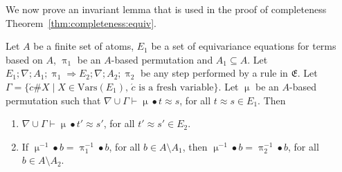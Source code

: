 \documentclass{llncs}
\newcommand{\Lra}{\Longrightarrow}
\newcommand{\vars}{\mathrm{Vars}}
\newcommand{\perm}{\approx}
\newcommand{\permef}{\bullet}
\newcommand\ppi{\uppi}
\newcommand\pmu{\upmu}
\newcommand{\msys}{\mathfrak{E}}
\newcommand{\fresh}[1]{{\acute{#1}}}
\begin{document}
We now prove an invariant lemma that is used in the proof of
completeness Theorem~\ref{thm:completeness:equiv}.




\begin{lemma}
  \label{lem:invariant}
  Let $A$ be a finite set of atoms, $E_1$ be a set of equivariance
  equations for terms based on $A$, $\ppi_1$ be an $A$-based
  permutation and $A_1\subseteq A$.  Let $E_1;\nabla;A_1;\ppi_1\Lra
  E_2;\nabla;A_2;\ppi_2$ be any step performed by a rule in $\msys$.
  Let $\Gamma = \{\fresh{c}\#X\mid X\in\vars(E_1),\, \mbox{$\fresh{c}$ is
    a fresh variable}\}$.  Let $\pmu$ be an $A$-based permutation such
  that $\nabla\cup\Gamma \vdash \pmu\permef t \approx s$, for all $t\perm s\in
  E_1$. Then
\begin{enumerate}
  \item\label{item:inv:1} $\nabla\cup\Gamma  \vdash \pmu \permef t'
    \approx s' $, for all $t'\perm
    s'\in E_2$.
  \item\label{item:inv:2} If $\pmu^{-1} \permef b = \ppi_1^{-1}
    \permef b$, for all $b \in A \setminus A_1$, then $\pmu^{-1}
    \permef b = \ppi_2^{-1} \permef b$, for all $b \in A \setminus
    A_2$.
\end{enumerate}
\end{lemma}
\end{document}
